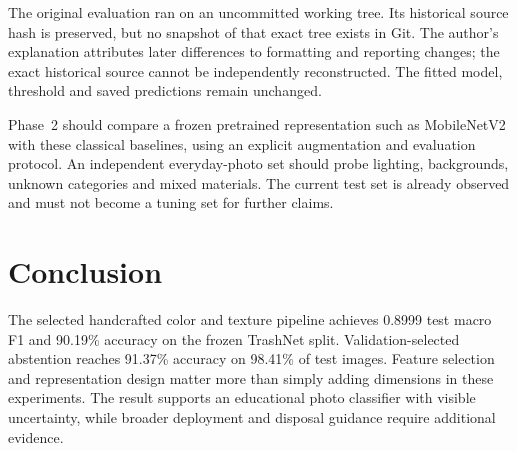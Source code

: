 \documentclass[conference]{IEEEtran}
\begin{document}
The original evaluation ran on an uncommitted working tree. Its historical source hash is preserved, but no snapshot of that exact tree exists in Git. The author's explanation attributes later differences to formatting and reporting changes; the exact historical source cannot be independently reconstructed. The fitted model, threshold and saved predictions remain unchanged.

Phase~2 should compare a frozen pretrained representation such as MobileNetV2 with these classical baselines, using an explicit augmentation and evaluation protocol. An independent everyday-photo set should probe lighting, backgrounds, unknown categories and mixed materials. The current test set is already observed and must not become a tuning set for further claims.

\section{Conclusion}
The selected handcrafted color and texture pipeline achieves 0.8999 test macro F1 and 90.19\% accuracy on the frozen TrashNet split. Validation-selected abstention reaches 91.37\% accuracy on 98.41\% of test images. Feature selection and representation design matter more than simply adding dimensions in these experiments. The result supports an educational photo classifier with visible uncertainty, while broader deployment and disposal guidance require additional evidence.

\balance


\end{document}
